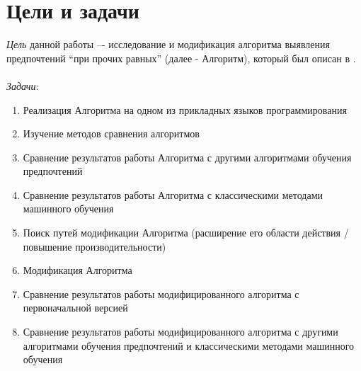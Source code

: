 \chapter*{Цели и задачи}

\emph{Цель} данной работы –- исследование и модификация алгоритма выявления предпочтений \enquote{при прочих равных} (далее - Алгоритм), который был описан в \cite{Obiedkov:2013}. 
\\
\\
\emph{Задачи}:
\begin{enumerate} 
	\item Реализация Алгоритма на одном из прикладных языков программирования
	\item Изучение методов сравнения алгоритмов
	\item Сравнение результатов работы Алгоритма с другими алгоритмами обучения предпочтений 
	\item Сравнение результатов работы Алгоритма с классическими методами машинного обучения
	\item Поиск путей модификации Алгоритма (расширение его области действия / повышение производительности)
	\item Модификация Алгоритма
	\item Сравнение результатов работы модифицированного алгоритма с первоначальной версией
	\item Сравнение результатов работы модифицированного алгоритма с другими алгоритмами обучения предпочтений и классическими методами машинного обучения
\end{enumerate}